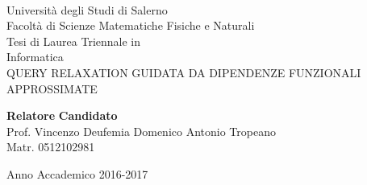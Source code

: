 \pagestyle{empty} 
\begin{center}
\\[0.2truecm]
{\Large Università degli Studi di Salerno}\\[0.2truecm]
{\large Facoltà di Scienze Matematiche Fisiche e Naturali}\\
\hrulefill
\vfill
{\large Tesi di Laurea Triennale in }\\[0.2truecm]
{\Large Informatica}\\
\vfill\vfill
{\large QUERY RELAXATION GUIDATA DA DIPENDENZE FUNZIONALI APPROSSIMATE}
\vfill\vfill


 {\bf Relatore} \hfill {\bf Candidato}\ \ \\
Prof. Vincenzo Deufemia \hfill Domenico Antonio Tropeano \\
\hfill Matr. 0512102981
\vfill
\hrulefill 

Anno Accademico 2016-2017

\end{center}
